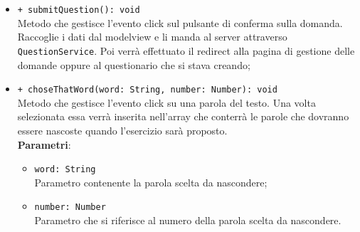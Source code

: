 \begin{itemize}
	\begin{itemize}
			\item \texttt{+ submitQuestion(): void}\\ 
			Metodo che gestisce l’evento click sul pulsante di conferma sulla domanda. Raccoglie i dati dal modelview e li manda al server attraverso \texttt{QuestionService}. Poi verrà effettuato il redirect alla pagina di gestione delle domande oppure al questionario che si stava creando; 
			\item \texttt{+ choseThatWord(word: String, number: Number): void}\\
			Metodo che gestisce l’evento click su una parola del testo. Una volta selezionata essa verrà inserita nell'array che conterrà le parole che dovranno essere nascoste quando l'esercizio sarà proposto. \\
			\textbf{Parametri}:
			\begin{itemize}
				\item \texttt{word: String} \\
				Parametro contenente la parola scelta da nascondere;
				\item \texttt{number: Number} \\ 
				Parametro che si riferisce al numero della parola scelta da nascondere.
			\end{itemize}
	\end{itemize}
\end{itemize}

